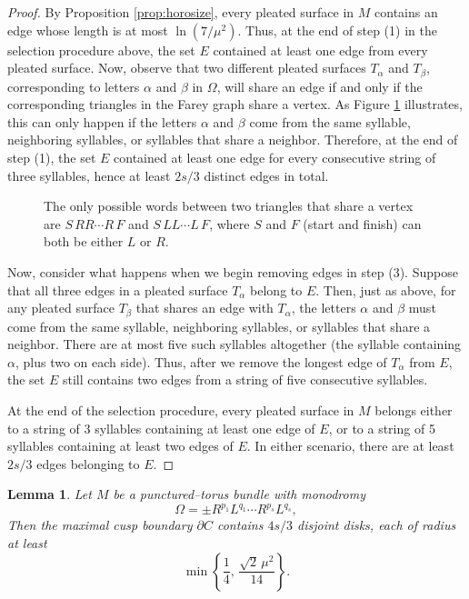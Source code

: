 \documentclass[11pt]{amsart}
\newcommand{\bdy}{{\partial}}
\theoremstyle{plain}
\newtheorem{lemma}[theorem]{Lemma}
\theoremstyle{definition}
\begin{document}
\begin{proof}
By Proposition \ref{prop:horosize}, every pleated surface in $M$
contains an edge whose length is at most $\ln(7/\mu^2)$.  Thus, at the
end of step (1) in the selection procedure above, the set $E$
contained at least one edge from every pleated surface.  Now, observe
that two different pleated surfaces $T_\alpha$ and $T_\beta$,
corresponding to letters $\alpha$ and $\beta$ in $\Omega$, will share
an edge if and only if the corresponding triangles in the Farey graph
share a vertex.  As Figure \ref{fig:farey} illustrates, this can only
happen if the letters $\alpha$ and $\beta$ come from the same
syllable, neighboring syllables, or syllables that share a neighbor.
Therefore, at the end of step (1), the set $E$ contained at least one
edge for every consecutive string of three syllables, hence at least
$2s/3$ distinct edges in total.

\begin{figure}
\begin{center}
  
\end{center}
\caption{The only possible words between two triangles that share a
	vertex are $S\,RR\cdots R\,F$ and $S\,LL\cdots L\,F$, where $S$ and
	$F$ (start and finish) can both be either $L$ or $R$.  }
\label{fig:farey}
\end{figure}

Now, consider what happens when we begin removing edges in step (3).
Suppose that all three edges in a pleated surface $T_\alpha$ belong to
$E$.  Then, just as above, for any pleated surface $T_\beta$ that
shares an edge with $T_\alpha$, the letters $\alpha$ and $\beta$ must
come from the same syllable, neighboring syllables, or syllables that
share a neighbor.  There are at most five such syllables altogether
(the syllable containing $\alpha$, plus two on each side).  Thus,
after we remove the longest edge of $T_\alpha$ from $E$, the set $E$
still contains two edges from a string of five consecutive syllables.

At the end of the selection procedure, every pleated surface in $M$
belongs either to a string of 3 syllables containing at least one edge
of $E$, or to a string of 5 syllables containing at least two edges of
$E$.  In either scenario, there are at least $2s/3$ edges belonging to
$E$.
\end{proof}

\begin{lemma}\label{lemma:disjoint-disks}
Let $M$ be a punctured--torus bundle with monodromy 
$$\Omega = \pm R^{p_1}L^{q_1} \cdots R^{p_s}L^{q_s},$$
%
Then the maximal cusp boundary $\bdy C$ contains $4s/3$ disjoint
disks, each of radius at least
$$\min \left\{ \frac{1}{4}, \, \frac{\sqrt{2} \, \mu^2}{14}
\right\}.$$
\end{lemma}
\end{document}
